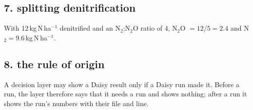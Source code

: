 \subsection{7. splitting denitrification}
With 12\,kg\,N\,ha$^{-1}$ denitrified and an N$_2$:N$_2$O ratio of 4, N$_2$O $=12/5=2.4$ and N$_2=9.6$\,kg\,N\,ha$^{-1}$.

\subsection{8. the rule of origin}
A decision layer may show a Daisy result only if a Daisy run made it. Before a run, the layer therefore says that it needs a run and shows nothing; after a run it shows the run's numbers with their file and line.

